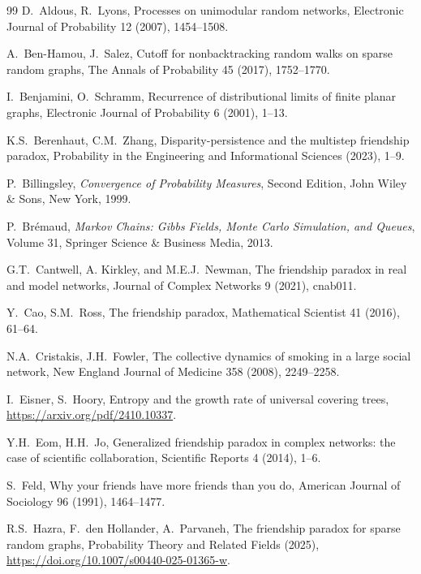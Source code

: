 \documentclass[11pt]{article}
\numberwithin{equation}{section}
\theoremstyle{plain}
\begin{document}

\begin{thebibliography}{99}
D.\ Aldous, R.\ Lyons,
Processes on unimodular random networks,
Electronic Journal of Probability 12 (2007), 1454--1508.

A.\ Ben-Hamou, J.\ Salez,
Cutoff for nonbacktracking random walks on sparse random graphs,
The Annals of Probability 45 (2017), 1752--1770.

I.\ Benjamini, O.\ Schramm,
Recurrence of distributional limits of finite planar graphs,
Electronic Journal of Probability 6 (2001), 1--13.

K.S.\ Berenhaut, C.M.\ Zhang, 
Disparity-persistence and the multistep friendship paradox,
Probability in the Engineering and Informational Sciences (2023), 1--9.

P.\ Billingsley, 
\textit{Convergence of Probability Measures}, Second Edition, John Wiley \& Sons, New York, 1999.

P.\ Br\'{e}maud,
\textit{Markov Chains: Gibbs Fields, Monte Carlo Simulation, and Queues}, Volume 31,
Springer Science \& Business Media, 2013.

G.T.\ Cantwell, A. Kirkley, and M.E.J.\ Newman,
The friendship paradox in real and model networks,
Journal of Complex Networks 9 (2021), cnab011. 

Y.\ Cao, S.M.\ Ross,
The friendship paradox, 
Mathematical Scientist 41 (2016), 61--64. 

N.A.\ Cristakis, J.H.\ Fowler, 
The collective dynamics of smoking in a large social network,
New England Journal of Medicine 358 (2008), 2249--2258.

I.\ Eisner, S.\ Hoory,
Entropy and the growth rate of universal covering trees,
\url{https://arxiv.org/pdf/2410.10337}.

Y.H.\ Eom, H.H.\ Jo, 
Generalized friendship paradox in complex networks: the case of scientific collaboration, 
Scientific Reports 4 (2014), 1--6.

S.\ Feld,
Why your friends have more friends than you do, 
American Journal of Sociology 96 (1991), 1464--1477.

R.S.\ Hazra, F.\ den Hollander, A.\ Parvaneh,
The friendship paradox for sparse random graphs, 
Probability Theory and Related Fields (2025), \url{https://doi.org/10.1007/s00440-025-01365-w}.


\end{thebibliography}
\end{document}
